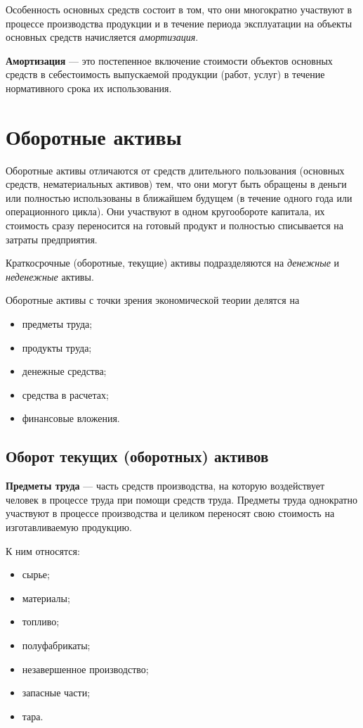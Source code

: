 \documentclass[a4paper,14pt]{extarticle}
\begin{document}
Особенность основных средств состоит в том, что они многократно участвуют в процессе производства продукции и в течение периода эксплуатации на объекты основных средств начисляется \textit{амортизация}.

{\bf Амортизация} — это постепенное включение стоимости объектов основных средств в себестоимость выпускаемой продукции (работ, услуг) в течение нормативного срока их использования.

\newpage
 
 \section{Оборотные активы}
 
 Оборотные активы отличаются от средств длительного пользования (основных средств, нематериальных активов) тем, что они могут быть обращены в деньги или полностью использованы в ближайшем будущем (в течение одного года или операционного цикла). Они участвуют в одном кругообороте капитала, их стоимость сразу переносится на готовый продукт и полностью списывается на затраты предприятия.
 
 Краткосрочные (оборотные, текущие) активы подразделяются на \textit{денежные} и \textit{неденежные} активы.
 
 Оборотные активы с точки зрения экономической теории делятся на 
 \begin{itemize}
 	\item предметы труда;
 	\item продукты труда;
 	\item денежные средства;
 	\item средства в расчетах;
 	\item финансовые вложения.
 \end{itemize}

\newpage

\subsection{Оборот текущих (оборотных) активов}

{\bf Предметы труда} — часть средств производства, на которую воздействует человек в процессе труда при помощи средств труда. Предметы труда однократно участвуют в процессе производства и целиком переносят свою стоимость на изготавливаемую продукцию. 

К ним относятся: 
\begin{itemize}
	\item сырье;
	\item материалы;
	\item топливо;
	\item полуфабрикаты;
	\item незавершенное производство;
	\item запасные части;
	\item тара.
\end{itemize}
\end{document}
